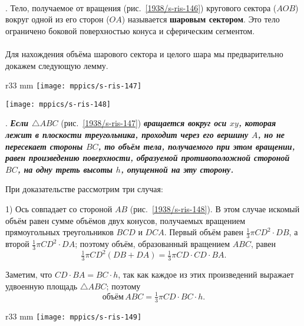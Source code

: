 \paragraph{}\label{1938/s140}
\mbox{.}
Тело, получаемое от вращения (рис.~\ref{1938/s-ris-146}) кругового сектора ($AOB$) вокруг одной из его сторон ($OA$) называется \textbf{шаровым сектором}.
Это тело ограничено боковой поверхностью конуса и сферическим сегментом.


\paragraph{}\label{1938/s141}
Для нахождения объёма шарового сектора и целого шара мы предварительно докажем следующую лемму.

\begin{wrapfigure}{r}{33 mm}
\vskip-0mm
\centering
\texttt{[image: mppics/s-ris-147]}
\caption{}\label{1938/s-ris-147}
\bigskip
\texttt{[image: mppics/s-ris-148]}
\caption{}\label{1938/s-ris-148}
\vskip-0mm
\end{wrapfigure}

\medskip

\mbox{.}
\textbf{\emph{Если $\triangle ABC$}} (рис.~\ref{1938/s-ris-147}) \textbf{\emph{вращается вокруг оси $xy$, которая лежит в плоскости треугольника, проходит через его вершину $A$, но не пересекает стороны $BC$, то объём тела, получаемого при этом вращении, равен произведению поверхности, образуемой противоположной стороной $BC$, на одну треть высоты $h$, опущенной на эту сторону.}}

При доказательстве рассмотрим три случая:

1) Ось совпадает со стороной $AB$ (рис.~\ref{1938/s-ris-148}).
В этом случае искомый объём равен сумме объёмов двух конусов, получаемых вращением прямоугольных треугольников $BCD$ и $DCA$.
Первый объём равен $\tfrac13 \pi CD^2\cdot DB$, а второй $\tfrac13\pi CD^2\cdot DA$;
поэтому объём, образованный вращением $ABC$, равен 
\[\tfrac13\pi CD^2(DB + DA) = \tfrac13\pi CD\cdot CD\cdot BA.\]

Заметим, что $CD\cdot BA=BC\cdot h$, так как каждое из этих произведений выражает удвоенную площадь $\triangle ABC$;
поэтому
\[\text{объём}\, ABC = \tfrac13\pi CD\cdot BC\cdot h.\]

\begin{wrapfigure}{r}{33 mm}
\vskip-0mm
\centering
\texttt{[image: mppics/s-ris-149]}
\caption{}\label{1938/s-ris-149}
\vskip-0mm
\end{wrapfigure}


